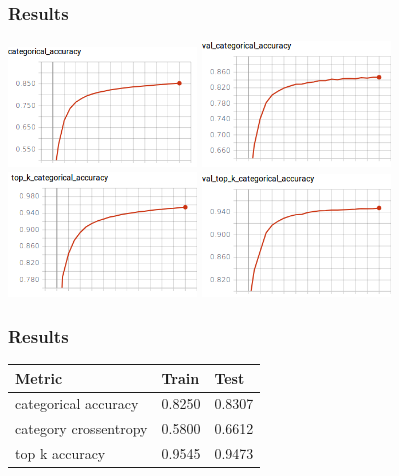 \documentclass[14pt]{beamer}
\begin{document}
		\begin{frame}
		\frametitle{Results}
			\hfil\hfil\includegraphics[width=5cm]{part4/final_CNN_train_category_accuracy}
			\hfil\hfil\includegraphics[width=5cm]{part4/final_CNN_val_category_accuracy}\newline
			\vfil
			\hfil\hfil\includegraphics[width=5cm]{part4/final_CNN_train_top_k_accuracy}
			\hfil\hfil\includegraphics[width=5cm]{part4/final_CNN_val_top_k_accuracy}\newline
		\end{frame}
		
		
		\begin{frame}
			\frametitle{Results}
			\begin{table}[h]
				\centering
				\begin{tabular}{| p{4cm} | p{3cm} | p{3cm} |}
					\hline
					\textbf{Metric}  & \textbf{Train} & \textbf{Test}                                                    
					\\ \hline
					categorical accuracy   &  0.8250 & 0.8307
					\\ \hline
					category crossentropy  &   0.5800 & 0.6612
					\\ \hline
					top k accuracy   &  0.9545 & 0.9473
					\\ \hline		
				\end{tabular}
			\end{table}
		\end{frame}
		
\end{document}
